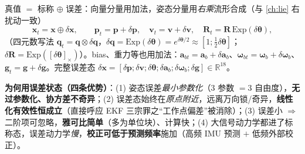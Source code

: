 \begin{definition}[三种状态]\label{def:eskf-states}
真值 $=$ 标称 $\oplus$ 误差：向量分量用加法，姿态分量用\emph{右乘}流形合成（与 \cref{ch:lie} 右扰动一致）
\begin{equation}
  \mathbf{x}_t=\mathbf{x}\oplus\delta\mathbf{x},\qquad
  \mathbf{p}_t=\mathbf{p}+\delta\mathbf{p},\quad
  \mathbf{v}_t=\mathbf{v}+\delta\mathbf{v},\quad
  \mathbf{R}_t=\mathbf{R}\,\mathrm{Exp}(\delta\boldsymbol{\theta}),
  \label{eq:eskf-states}
\end{equation}
（四元数写法 $\mathbf{q}_t=\mathbf{q}\otimes\delta\mathbf{q}$，$\delta\mathbf{q}=\mathrm{Exp}(\delta\boldsymbol{\theta})=e^{\delta\boldsymbol{\theta}/2}\approx[1;\tfrac12\delta\boldsymbol{\theta}]$；$\delta\mathbf{R}=\mathrm{Exp}([\delta\boldsymbol{\theta}]_\times)$）。bias、重力等也用加法：$\mathbf{a}_{bt}=\mathbf{a}_b+\delta\mathbf{a}_b$、$\boldsymbol{\omega}_{bt}=\boldsymbol{\omega}_b+\delta\boldsymbol{\omega}_b$、$\mathbf{g}_t=\mathbf{g}+\delta\mathbf{g}$。完整误差态 $\delta\mathbf{x}=[\delta\mathbf{p};\delta\mathbf{v};\delta\boldsymbol{\theta};\delta\mathbf{a}_b;\delta\boldsymbol{\omega}_b;\delta\mathbf{g}]\in\mathbb{R}^{18}$。
\end{definition}

\begin{insight}
\textbf{为何用误差状态（四条优势）}\cite{sola2017quaternion}：(1) 姿态误差\emph{最小参数化}（$3$ 参数 $=3$ 自由度），\textbf{无过参数化、协方差不奇异}；(2) 误差态始终在\emph{原点附近}，远离万向锁/奇异，\textbf{线性化有效性恒成立}（直接呼应 EKF 三宗罪之“工作点偏差”被消除）；(3) 误差小 $\Rightarrow$ 二阶项可忽略，\textbf{雅可比简单}（多为单位块）、计算快；(4) 大信号动力学都进了标称态，误差动力学\emph{慢}，\textbf{校正可低于预测频率}施加（高频 IMU 预测 $+$ 低频外部校正）。
\end{insight}


